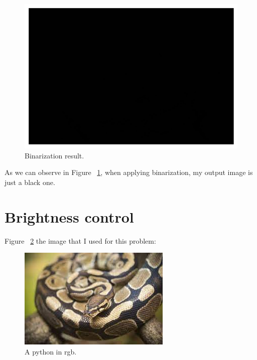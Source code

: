 \documentclass{article}
\begin{document}
	\begin{figure}
		\includegraphics[width=\linewidth]{binarization.png}
		\caption{Binarization result.}
		\label{fig:binarization}
	\end{figure}
	
	As we can observe in Figure ~\ref{fig:binarization}, when applying binarization, my output image is just a black one.
	
	\section{Brightness control}
	Figure ~\ref{fig:python} the image that I used for this problem:
	
	\begin{figure}
		\includegraphics[width=\linewidth]{python.jpg}
		\caption{A python in rgb.}
		\label{fig:python}
	\end{figure}
	
\end{document}
